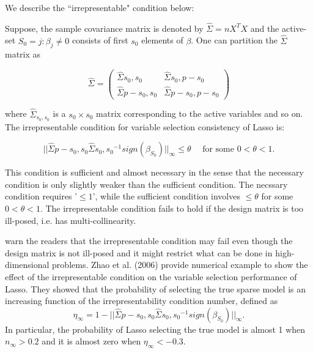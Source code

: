 \documentclass[chapters]{uamaththesis}
\begin{document}
We describe the ``irrepresentable" condition below:\par Suppose, the sample covariance matrix is denoted by $\hat{\Sigma} = nX^T X$ and the active-set $S_0 = { j : \beta_j \neq 0}$ consists of first $s_0$ elements of $\beta$. One can partition the $\hat{\Sigma}$ matrix as

$$ \hat{\Sigma} = \left(\begin{array}{cc}
\hat{\Sigma}{s_0,s_0} & \hat{\Sigma}{s_0,p-s_0} \\ \hat{\Sigma}{p-s_0,s_0} & \hat{\Sigma}{p-s_0,p-s_0} \end{array} \right) $$

where $\hat{\Sigma}_{s_0,s_0}$ is a $s_0\times s_0$ matrix corresponding to the active variables and so on. The irrepresentable condition for variable selection consistency of Lasso is:

$$ || \hat{\Sigma}{p-s_0,s_0} \hat{\Sigma}{s_0,s_0}^{-1} sign(\beta_{S_0}) ||_{\infty} \leq \theta \quad \mbox{ for some } 0 < \theta < 1 .$$

This condition is sufficient and almost necessary in the sense that the necessary condition is only slightly weaker than the sufficient condition. The necssary condition requires '$\leq 1$', while the sufficient condition involves $\leq \theta$ for some $0 < \theta < 1$. The irrepresentable condition fails to hold if the design matrix is too ill-posed, i.e. has multi-collinearity.

\citep{buhlmann2011statistics} warn the readers that the irrepresentable condition may fail even though the design matrix is not ill-posed and it might restrict what can be done in high-dimensional problems. Zhao et al. (2006) provide numerical example to show the effect of the irrepresentable condition on the variable selection performance of Lasso. They showed that the probability of selecting the true sparse model is an increasing function of the irrepresentability condition number, defined as $$ \eta_{\infty} = 1 - || \hat{\Sigma}{p-s_0,s_0} \hat{\Sigma}{s_0,s_0}^{-1} sign(\beta_{S_0}) ||_{\infty} . $$ In particular, the probability of Lasso selecting the true model is almost 1 when $n_{\infty} > 0.2$ and it is almost zero when $\eta_{\infty} < -0.3$.
\end{document}
